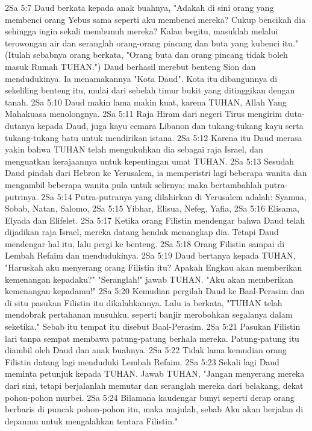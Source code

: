 2Sa 5:7  Daud berkata kepada anak buahnya, "Adakah di sini orang yang membenci orang Yebus sama seperti aku membenci mereka? Cukup bencikah dia sehingga ingin sekali membunuh mereka? Kalau begitu, masuklah melalui terowongan air dan seranglah orang-orang pincang dan buta yang kubenci itu." (Itulah sebabnya orang berkata, "Orang buta dan orang pincang tidak boleh masuk Rumah TUHAN.") Daud berhasil merebut benteng Sion dan mendudukinya. Ia menamakannya "Kota Daud". Kota itu dibangunnya di sekeliling benteng itu, mulai dari sebelah timur bukit yang ditinggikan dengan tanah.
2Sa 5:10  Daud makin lama makin kuat, karena TUHAN, Allah Yang Mahakuasa menolongnya.
2Sa 5:11  Raja Hiram dari negeri Tirus mengirim duta-dutanya kepada Daud, juga kayu cemara Libanon dan tukang-tukang kayu serta tukang-tukang batu untuk mendirikan istana.
2Sa 5:12  Karena itu Daud merasa yakin bahwa TUHAN telah mengukuhkan dia sebagai raja Israel, dan menguatkan kerajaannya untuk kepentingan umat TUHAN.
2Sa 5:13  Sesudah Daud pindah dari Hebron ke Yerusalem, ia memperistri lagi beberapa wanita dan mengambil beberapa wanita pula untuk selirnya; maka bertambahlah putra-putrinya.
2Sa 5:14  Putra-putranya yang dilahirkan di Yerusalem adalah: Syamua, Sobab, Natan, Salomo,
2Sa 5:15  Yibhar, Elisua, Nefeg, Yafia,
2Sa 5:16  Elisama, Elyada dan Elifelet.
2Sa 5:17  Ketika orang Filistin mendengar bahwa Daud telah dijadikan raja Israel, mereka datang hendak menangkap dia. Tetapi Daud mendengar hal itu, lalu pergi ke benteng.
2Sa 5:18  Orang Filistin sampai di Lembah Refaim dan mendudukinya.
2Sa 5:19  Daud bertanya kepada TUHAN, "Haruskah aku menyerang orang Filistin itu? Apakah Engkau akan memberikan kemenangan kepadaku?" "Seranglah!" jawab TUHAN. "Aku akan memberikan kemenangan kepadamu!"
2Sa 5:20  Kemudian pergilah Daud ke Baal-Perasim dan di situ pasukan Filistin itu dikalahkannya. Lalu ia berkata, "TUHAN telah mendobrak pertahanan musuhku, seperti banjir merobohkan segalanya dalam seketika." Sebab itu tempat itu disebut Baal-Perasim.
2Sa 5:21  Pasukan Filistin lari tanpa sempat membawa patung-patung berhala mereka. Patung-patung itu diambil oleh Daud dan anak buahnya.
2Sa 5:22  Tidak lama kemudian orang Filistin datang lagi menduduki Lembah Refaim.
2Sa 5:23  Sekali lagi Daud meminta petunjuk kepada TUHAN. Jawab TUHAN, "Jangan menyerang mereka dari sini, tetapi berjalanlah memutar dan seranglah mereka dari belakang, dekat pohon-pohon murbei.
2Sa 5:24  Bilamana kaudengar bunyi seperti derap orang berbaris di puncak pohon-pohon itu, maka majulah, sebab Aku akan berjalan di depanmu untuk mengalahkan tentara Filistin."
